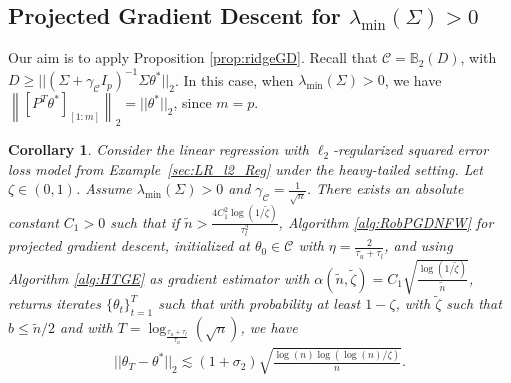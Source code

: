 \documentclass{article}
\newtheorem{corollary}{Corollary}
\begin{document}

\subsection{Projected Gradient Descent for $\lambda_{\min}(\Sigma) > 0$}
\label{sec:The Case when l>0}

Our aim is to apply Proposition \ref{prop:ridgeGD}. Recall that $\mathcal{C} = \mathbb{B}_2(D)$, with $D \geq ||(\Sigma + \gamma_{\mathcal{C}}I_p)^{-1}\Sigma\theta^*||_2$. In this case, when $\lambda_{\min}(\Sigma) > 0$, we have $\left\|[P^T\theta^*]_{[1:m]}\right\|_2 = ||\theta^*||_2$, since $m = p$. 
\begin{corollary}
\label{corollary:HT_Ridge_min>0}
Consider the linear regression with $\ell_2$-regularized squared error loss model from Example~\ref{sec:LR_l2_Reg} under the heavy-tailed setting. Let $\zeta \in (0, 1)$. Assume $\lambda_{\min}(\Sigma) > 0$ and $\gamma_{\mathcal{C}} = \frac{1}{\sqrt{n}}$. There exists an absolute constant $C_1 > 0$ such that if $\widetilde{n} > \frac{4C_1^2\log(1/\widetilde{\zeta})}{\tau_l^2}$, Algorithm \ref{alg:RobPGDNFW} for projected gradient descent, initialized at $\theta_0 \in \mathcal{C}$ with $\eta = \frac{2}{\tau_u + \tau_l}$, and using Algorithm \ref{alg:HTGE} as gradient estimator with $\alpha(\widetilde{n}, \widetilde{\zeta}) = C_1\sqrt{\frac{\log(1/\widetilde{\zeta})}{\widetilde{n}}}$, returns iterates $\{\theta_t\}_{t = 1}^T$ such that with probability at least $1 - \zeta$, with $\widetilde{\zeta}$ such that $b \leq \widetilde{n}/2$ and with $T = \log_{\frac{\tau_u + \tau_l}{\tau_u}}(\sqrt{n})$, we have
\begin{align}
\label{eq:RI_HT}
||\theta_T - \theta^*||_2 \lesssim (1 + \sigma_2)\sqrt{\frac{\log(n)\log(\log(n)/\zeta)}{n}}.
\end{align}
\end{corollary}
\end{document}
